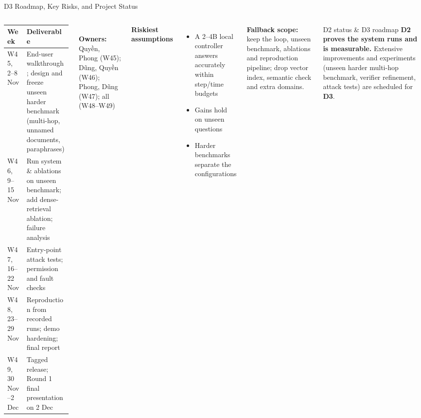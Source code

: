 \documentclass[aspectratio=1610,11pt]{beamer}
\renewcommand{\arraystretch}{1.15}
\begin{document}
\begin{frame}{D3 Roadmap, Key Risks, and Project Status}
  \begin{columns}[T]
    \scriptsize\renewcommand{\arraystretch}{1.15}
    \begin{tabularx}{\linewidth}{@{}>{\raggedright\arraybackslash}p{2.25cm}>{\raggedright\arraybackslash}X@{}}
      \toprule Week & Deliverable\\\midrule
      W45, 2--8 Nov & End-user walkthrough; design and freeze unseen harder benchmark (multi-hop, unnamed documents, paraphrases)\\
      W46, 9--15 Nov & Run system \& ablations on unseen benchmark; add dense-retrieval ablation; failure analysis\\
      W47, 16--22 Nov & Entry-point attack tests; permission and fault checks\\
      W48, 23--29 Nov & Reproduction from recorded runs; demo hardening; final report\\
      W49, 30 Nov--2 Dec & Tagged release; Round 1 final presentation on 2 Dec\\
      \bottomrule
    \end{tabularx}\\[4pt]
    \footnotesize \textbf{Owners:} Quyền, Phong (W45); Dũng, Quyền (W46); Phong, Dũng (W47); all (W48--W49)

    \footnotesize
    \textbf{Riskiest assumptions}
    \begin{itemize}
      \item A 2--4B local controller answers accurately within step/time budgets
      \item Gains hold on unseen questions
      \item Harder benchmarks separate the configurations
    \end{itemize}
    \vspace{2pt}
    \textbf{Fallback scope:} keep the loop, unseen benchmark, ablations and reproduction pipeline; drop vector index, semantic check and extra domains.
    \vspace{4pt}

    \begin{block}{D2 status \& D3 roadmap}
      \scriptsize \textbf{D2 proves the system runs and is measurable.} Extensive improvements and experiments (unseen harder multi-hop benchmark, verifier refinement, attack tests) are scheduled for \textbf{D3}.
    \end{block}
  \end{columns}
\end{frame}
\end{document}
